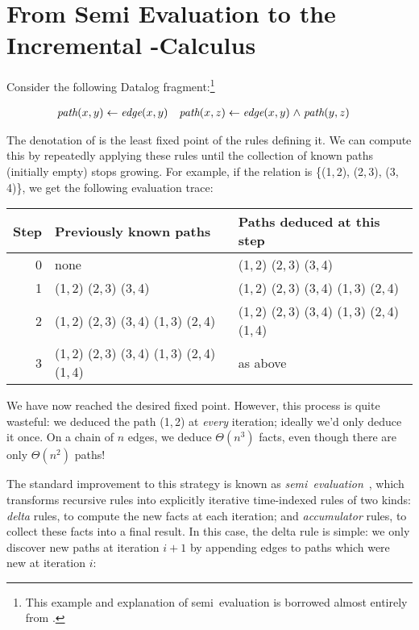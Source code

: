 \section{From Semi\naive{} Evaluation to the Incremental \boldfn-Calculus}
\label{sec:seminaive-and-ilc}

Consider the following Datalog fragment:\footnote{This example and explanation
  of semi\naive\ evaluation is borrowed almost entirely from
  \citet{DBLP:conf/esop/Alvarez-Picallo19}.}

\begin{align*}
  \name{path}(x,y) &\gets \name{edge}(x,y)
  &
  \name{path}(x,z) &\gets \name{edge}(x,y) \wedge \name{path}(y,z)
\end{align*}

\noindent
The denotation of  is the least fixed point of the rules defining
it.
We can compute this by repeatedly applying these rules until the collection
of known paths (initially empty) stops growing.
%
For example, if the  relation is \{(1,\,2), (2,\,3), (3,\,4)\}, we
get the following evaluation trace:

\begin{center}
  \setlength\tabcolsep{1em}
  \def\arraystretch{1.1}
  \begin{tabular}{@{}rll@{}}
    Step
    & Previously known paths
    & Paths deduced at this step
    \\\midrule
    0
    & none
    & (1,\,2) (2,\,3) (3,\,4)
    \\
    1
    & (1,\,2) (2,\,3) (3,\,4)
    & (1,\,2) (2,\,3) (3,\,4) (1,\,3) (2,\,4)
    \\
    2
    & (1,\,2) (2,\,3) (3,\,4) (1,\,3) (2,\,4)
    & (1,\,2) (2,\,3) (3,\,4) (1,\,3) (2,\,4) (1,\,4)
    \\
    3
    & (1,\,2) (2,\,3) (3,\,4) (1,\,3) (2,\,4) (1,\,4)
    & as above
  \end{tabular}
\end{center}

\noindent We have now reached the desired fixed point. However, this process is
quite wasteful: we deduced the path (1,\,2) at \emph{every} iteration; ideally
we'd only deduce it once. On a chain of $n$ edges, we deduce $\Theta(n^3)$
facts, even though there are only $\Theta(n^2)$ paths!

The standard improvement to this strategy is known as
\emph{semi\naive\ evaluation}~\cite{seminaive}, which transforms recursive rules
into explicitly iterative time-indexed rules of two kinds: \emph{delta} rules,
to compute the new facts at each iteration; and \emph{accumulator} rules, to
collect these facts into a final result.
%
%
\noindent In this case, the delta rule is simple: we only discover new paths at
iteration $i+1$ by appending edges to paths which were new at iteration $i$:

